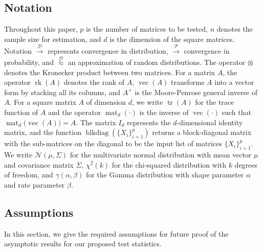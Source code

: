 \documentclass[12pt]{article}
\numberwithin{thm}{section}
\numberwithin{defn}{section}
\numberwithin{lem}{section}
\numberwithin{prop}{section}
\numberwithin{cor}{section}
\numberwithin{rem}{section}
\DeclareMathOperator{\Vector}{vec}
\DeclareMathOperator{\tr}{tr}
\DeclareMathOperator{\blkdiag}{blkdiag}
\DeclareMathOperator{\mat}{mat}
\newcommand{\rank}{\operatorname{rk}}
\begin{document}
\subsection{Notation} \label{subsec:not}
\vspace{-0.5cm}
Throughout this paper, $p$ is the number of matrices to be tested, $n$ denotes the sample size for estimation, and $d$ is the dimension of the square matrices. Notation $\xrightarrow{\mathcal{D}}$ represents convergence in distribution, $\xrightarrow{\mathcal{P}}$ convergence in probability, and $\stackrel{\mathcal{D}}{\approx}$ an approximation of random distributions. The operator $\otimes$ denotes the Kronecker product between two matrices.
For a matrix $A$, the operator $\rank(A)$ denotes the rank of $A$, $\Vector(A)$ transforms $A$ into a vector form by stacking all its columns, and $A^+$ is the Moore-Penrose general inverse of $A$. For a square matrix $A$ of dimension $d$, we write $\tr(A)$ for the trace function of $A$ and the operator $\mat_d(\cdot)$ is the inverse of $\Vector(\cdot)$ such that $\mat_d\big(\Vector(A)\big) = A$.
The matrix $I_d$ represents the $d$-dimensional identity matrix, and the function $\blkdiag(\{X_i\}_{i=1}^p)$ returns a block-diagonal matrix with the sub-matrices on the diagonal to be the input list of matrices $\{X_i\}_{i=1}^p$. We write $\mathcal{N}(\mu, \Sigma)$ for the multivariate normal distribution with mean vector $\mu$ and covariance matrix $\Sigma$, $\chi^2(k)$ for the chi-squared distribution with $k$ degrees of freedom, and $\gamma(\alpha, \beta)$ for the Gamma distribution with shape parameter $\alpha$ and rate parameter $\beta$.

\vspace{-0.3cm}
\subsection{Assumptions} \label{subsec:ass}
\vspace{-0.3cm}
In this section, we give the required assumptions for future proof of the asymptotic results for our proposed test statistics. 
\end{document}
